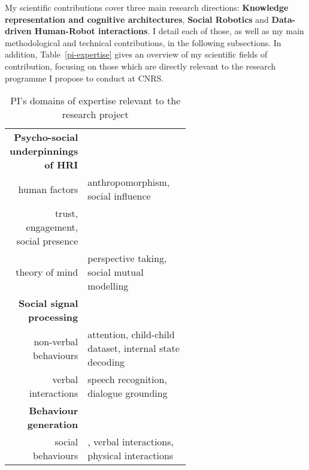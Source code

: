     \vspace{2em}



My scientific contributions cover three main research directions:
\textbf{Knowledge representation and cognitive architectures}, \textbf{Social
Robotics} and \textbf{Data-driven Human-Robot interactions}. I detail each of
those, as well as my main methodological and technical contributions, in the
following subsections. In addition, Table~\ref{pi-expertise} gives an overview
of my scientific fields of contribution, focusing on those which are directly
relevant to the research programme I propose to conduct at CNRS.

\begin{table}[h!]
    \centering
    \caption{\small PI's domains of expertise relevant to the research project}
    \begin{tabular}{rp{0.6\linewidth}}
        \toprule
        \textbf{Psycho-social underpinnings of HRI} \\  
        human factors & \small anthropomorphism\autocite{lemaignan2014dynamics,lemaignan2014cognitive}, social influence\cite{winkle2019effective} \\
        trust, engagement, social presence & \small
        \autocite{flook2019impact,lemaignan2015youre,fink2014which,irfan2018social,wijnen2020performing} \\
        theory of mind & \small perspective taking\cite{ros2010which, warnier2012when}, social mutual modelling\cite{lemaignan2015mutual,dillenbourg2016symmetry} \\
        \midrule
        \textbf{Social signal processing}\\
        non-verbal behaviours & \small attention\cite{lemaignan2016realtime},
        child-child dataset\cite{lemaignan2018pinsoro}, internal state decoding\cite{bartlett2019what} \\
        verbal interactions & \small speech recognition\cite{kennedy2017child}, dialogue grounding\cite{lemaignan2011grounding} \\
        \midrule
        \textbf{Behaviour generation} \\
        social behaviours & \small \cite{lallee2011towards}, verbal interactions\cite{wallbridge2019generating, wallbridge2019towards}, physical interactions\cite{gharbi2013natural} \\

\end{tabular}
\end{table}

